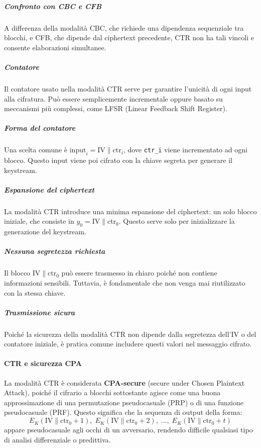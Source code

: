 \documentclass{report}
\begin{document}
\subparagraph{Confronto con CBC e CFB} 
A differenza della modalità CBC, che richiede una dipendenza sequenziale tra blocchi, e CFB, che dipende dal ciphertext precedente, CTR non ha tali vincoli e consente elaborazioni simultanee.

\subparagraph{Contatore}
Il contatore usato nella modalità CTR serve per garantire l'unicità di ogni input alla cifratura. Può essere semplicemente incrementale oppure basato su meccanismi più complessi, come LFSR (Linear Feedback Shift Register).

\subparagraph{Forma del contatore}
Una scelta comune è \( \text{input}_i = \text{IV} \| \text{ctr}_i \), dove \texttt{ctr\_i} viene incrementato ad ogni blocco. Questo input viene poi cifrato con la chiave segreta per generare il keystream.

\subparagraph{Espansione del ciphertext}
La modalità CTR introduce una minima espansione del ciphertext: un solo blocco iniziale, che consiste in \( y_0 = \text{IV} \| \text{ctr}_0 \). Questo serve solo per inizializzare la generazione del keystream.

\subparagraph{Nessuna segretezza richiesta}
Il blocco \( \text{IV} \| \text{ctr}_0 \) può essere trasmesso in chiaro poiché non contiene informazioni sensibili. Tuttavia, è fondamentale che non venga mai riutilizzato con la stessa chiave.

\subparagraph{Trasmissione sicura}
Poiché la sicurezza della modalità CTR non dipende dalla segretezza dell’IV o del contatore iniziale, è pratica comune includere questi valori nel messaggio cifrato.

\paragraph{CTR e sicurezza CPA}
La modalità CTR è considerata \textbf{CPA-secure} (secure under Chosen Plaintext Attack), poiché il cifrario a blocchi sottostante agisce come una buona approssimazione di una permutazione pseudocasuale (PRP) o di una funzione pseudocasuale (PRF). Questo significa che la sequenza di output della forma:
\[
E_K(\text{IV} \| \text{ctr}_0 + 1),\; E_K(\text{IV} \| \text{ctr}_0 + 2),\; \ldots,\; E_K(\text{IV} \| \text{ctr}_0 + t)
\]
appare pseudocasuale agli occhi di un avversario, rendendo difficile qualsiasi tipo di analisi differenziale o predittiva.
\end{document}
